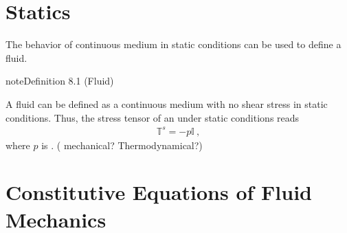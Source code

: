 \documentclass[letterpaper,10pt,english]{jupyterBook}
\begin{document}
\chapter{Statics}
\label{\detokenize{ch/fluids/statics:statics}}\label{\detokenize{ch/fluids/statics:fluid-mechanics-statics}}\label{\detokenize{ch/fluids/statics::doc}}
\sphinxAtStartPar
The behavior of continuous medium in static conditions can be used to define a fluid.
\label{ch/fluids/statics:definition-0}
\begin{sphinxadmonition}{note}{Definition 8.1 (Fluid)}



\sphinxAtStartPar
A fluid can be defined as a continuous medium with no shear stress in static conditions. Thus, the stress tensor of an  under static conditions reads
\begin{equation*}
\begin{split}\mathbb{T}^s = - p \mathbb{I} \ ,\end{split}
\end{equation*}
\sphinxAtStartPar
where \(p\) is . ( mechanical? Thermodynamical?)
\end{sphinxadmonition}

\sphinxstepscope


\chapter{Constitutive Equations of Fluid Mechanics}
\label{\detokenize{ch/fluids/constitutive-equations:constitutive-equations-of-fluid-mechanics}}\label{\detokenize{ch/fluids/constitutive-equations:fluid-mechanics-constutive-equations}}\label{\detokenize{ch/fluids/constitutive-equations::doc}}
\end{document}
